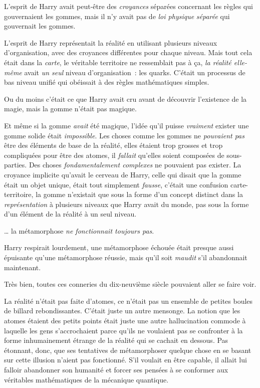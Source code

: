 L'esprit de Harry avait peut-être des \emph{croyances} séparées concernant les règles qui gouvernaient les gommes, mais il n'y avait pas de \emph{loi physique} \emph{séparée} qui gouvernait les gommes.

L'esprit de Harry représentait la réalité en utilisant plusieurs niveaux d'organisation, avec des croyances différentes pour chaque niveau. Mais tout cela était dans la \emph{carte}, le véritable territoire ne ressemblait pas à ça, \emph{la réalité elle-même} avait \emph{un seul} niveau d'organisation~: les quarks. C'était un processus de bas niveau unifié qui obéissait à des règles mathématiques simples.

Ou du moins c'était ce que Harry avait cru avant de découvrir l'existence de la magie, mais la gomme n'était pas magique.

Et même si la gomme \emph{avait} été magique, l'idée qu'il puisse \emph{vraiment} exister une gomme solide était \emph{impossible}. Les choses comme les gommes ne \emph{pouvaient pas} être des éléments de base de la réalité, elles étaient trop grosses et trop compliquées pour être des atomes, il \emph{fallait} qu'elles soient composées de sous-parties. Des choses \emph{fondamentalement complexes} ne pouvaient pas exister. La croyance implicite qu'avait le cerveau de Harry, celle qui disait que la gomme était un objet unique, était tout simplement \emph{fausse}, c'était une confusion carte-territoire, la gomme n'existait que sous la forme d'un concept distinct dans la \emph{représentation} à plusieurs niveaux que Harry avait du monde, pas sous la forme d'un élément de la réalité à un seul niveau.

… la métamorphose \emph{ne fonctionnait toujours pas}.

Harry respirait lourdement, une métamorphose échouée était presque aussi épuisante qu'une métamorphose réussie, mais qu'il soit \emph{maudit} s'il abandonnait maintenant.

Très bien, toutes ces conneries du dix-neuvième siècle pouvaient aller se faire voir.

La réalité n'était pas faite d'atomes, ce n'était pas un ensemble de petites boules de billard rebondissantes. C'était juste un autre mensonge. La notion que les atomes étaient des petits points était juste une autre hallucination commode à laquelle les gens s'accrochaient parce qu'ils ne voulaient pas se confronter à la forme inhumainement étrange de la réalité qui se cachait en dessous. Pas étonnant, donc, que ses tentatives de métamorphoser quelque chose en se basant sur cette illusion n'aient pas fonctionné. S'il voulait en être capable, il allait lui falloir abandonner son humanité et forcer ses pensées à se conformer aux véritables mathématiques de la mécanique quantique.

